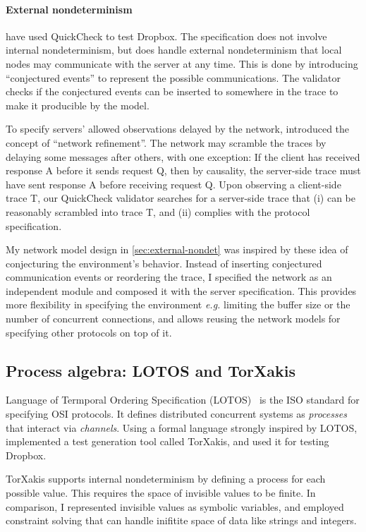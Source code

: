 \paragraph{External nondeterminism}
\citet{testing-dropbox} have used QuickCheck to test Dropbox.  The specification
does not involve internal nondeterminism, but does handle external
nondeterminism that local nodes may communicate with the server at any time.
This is done by introducing ``conjectured events'' to represent the possible
communications.  The validator checks if the conjectured events can be inserted
to somewhere in the trace to make it producible by the model.

To specify servers' allowed observations delayed by the network, \citet{cpp19}
introduced the concept of ``network refinement''.  The network may scramble the
traces by delaying some messages after others, with one exception: If the client
has received response \ilc A before it sends request \ilc Q, then by causality,
the server-side trace must have sent response \ilc A before receiving request
\ilc Q.  Upon observing a client-side trace \ilc T, our QuickCheck validator
searches for a server-side trace that (i) can be reasonably scrambled into trace
\ilc T, and (ii) complies with the protocol specification.

My network model design in \autoref{sec:external-nondet} was inspired by these
idea of conjecturing the environment's behavior.  Instead of inserting
conjectured communication events or reordering the trace, I specified the
network as an independent module and composed it with the server specification.
This provides more flexibility in specifying the environment {\it e.g.} limiting
the buffer size or the number of concurrent connections, and allows reusing the
network models for specifying other protocols on top of it.

\subsection{Process algebra: LOTOS and TorXakis}
Language of Termporal Ordering Specification (LOTOS)~\cite{lotos} is the ISO
standard for specifying OSI protocols.  It defines distributed concurrent
systems as {\em processes} that interact via {\em channels}.  Using a formal
language strongly inspired by LOTOS, \citet{torxakis-dropbox} implemented a test
generation tool called TorXakis, and used it for testing Dropbox.

TorXakis supports internal nondeterminism by defining a process for each
possible value.  This requires the space of invisible values to be finite.  In
comparison, I represented invisible values as symbolic variables, and employed
constraint solving that can handle inifitite space of data like strings and
integers.

